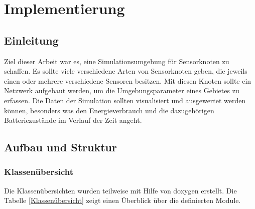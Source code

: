 \chapter{Implementierung}

\section{Einleitung}

Ziel dieser Arbeit war es, eine Simulationsumgebung für Sensorknoten zu schaffen. Es sollte viele verschiedene Arten von Sensorknoten geben, die jeweils einen oder mehrere verschiedene Sensoren besitzen. Mit diesen Knoten sollte ein Netzwerk aufgebaut werden, um die Umgebungsparameter eines Gebietes zu erfassen.
Die Daten der Simulation sollten visualisiert und ausgewertet werden können, besonders was den Energieverbrauch und die dazugehörigen Batteriezustände im Verlauf der Zeit angeht.

\section{Aufbau und Struktur}

\subsection{Klassenübersicht}

Die Klassenübersichten wurden teilweise mit Hilfe von doxygen\cite{doxygen} erstellt. Die Tabelle \ref{Klassenübersicht} zeigt einen Überblick über die definierten Module.

